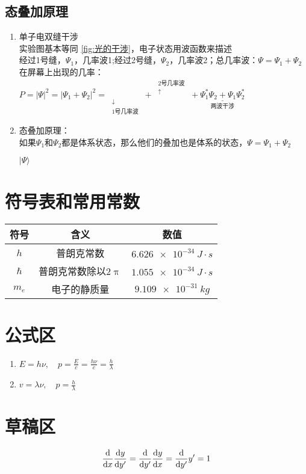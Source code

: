 \documentclass{article}
\begin{document}
\subsection{态叠加原理}
\begin{enumerate}[label=(\arabic*)]
	\item 单子电双缝干涉\\
				实验图基本等同 \ref{fig:光的干涉}，电子状态用波函数来描述\\
				经过1号缝，$\Psi_1$，几率波1;经过2号缝，$\Psi_2$，几率波2；总几率波：$\Psi=\Psi_1+\Psi_2$\\
				在屏幕上出现的几率：$P = |\Psi|^2 = |\Psi_1+\Psi_2|^2 = \mathop{|\Psi_1|^2}\limits_{\substack{\downarrow\\ \text{1号几率波}}}+\mathop{|\Psi_2|^2}^{\substack{\text{2号几率波}\\ \uparrow}}+\underset{\text{两波干涉}}{\underline{\Psi_1^{*}\Psi_2+\Psi_1\Psi_2^{*}}}$
	\item 态叠加原理：\\
				如果$\Psi_1$和$\Psi_2$都是体系状态，那么他们的叠加也是体系的状态，$\Psi=\Psi_1+\Psi_2$\\
				\begin{example}
					$|\Psi\rangle$
				\end{example}
\end{enumerate}

\appendix
\section{符号表和常用常数}
\begin{table}[H]
	\centering
	\renewcommand\arraystretch{1.5}
	\begin{tabular}{ccc}
		\toprule
		符号 & 含义 & 数值\\
		\midrule
		$h$ & 普朗克常数 & $\SI{6.626e-34}{J\cdot s}$\\
		$\hbar$ & 普朗克常数除以$2\uppi$ & $\SI{1.055e-34}{J\cdot s}$\\
		$m_e$ & 电子的静质量 & $\SI{9.109e-31}{kg}$\\
		\bottomrule
	\end{tabular}
\end{table}
\section{公式区}
\begin{enumerate}[label=(\alph*)]
	\item $E=h\nu,\quad p=\frac{E}{c}=\frac{h\nu}{c}=\frac{h}{\lambda}$
	\item $v=\lambda \nu,\quad p=\frac{h}{\lambda}$
\end{enumerate}

\section{草稿区}
\[\frac{\dif}{\dif x}\frac{\dif y}{\dif y'}=\frac{\dif}{\dif y'}\frac{\dif y}{\dif x}=\frac{\dif}{\dif y'}y'=1\]
\end{document}
